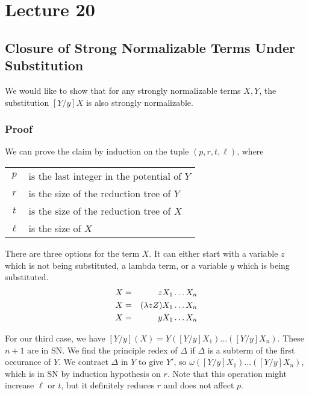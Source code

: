 \chapter{Lecture 20}

\section{Closure of Strong Normalizable Terms Under Substitution}
We would like to show that for any strongly normalizable terms $X,Y$, the substitution $[Y/y]X$ is also strongly normalizable.

\subsection{Proof}
We can prove the claim by induction on the tuple $(p,r,t,\ell)$, where
\begin{center}
  \begin{tabular}{c l}
    $p$ & is the last integer in the potential of $Y$\\
    $r$ & is the size of the reduction tree of $Y$\\
    $t$ & is the size of the reduction tree of $X$\\
    $\ell$ & is the size of $X$\\
  \end{tabular}
\end{center}

There are three options for the term $X$. It can either start with a variable $z$ which is not being substituted, a lambda term, or a variable $y$ which is being substituted.
\begin{eqnarray*}
  X &=& zX_1\ldots X_n\\
  X &=& (\lambda zZ)X_1\ldots X_n\\
  X &=& yX_1\ldots X_n\\
\end{eqnarray*}

For our third case, we have $[Y/y](X) = Y([Y/y]X_1)\ldots([Y/y]X_n)$. These $n + 1$ are in SN. We find the principle redex of $\Delta$ if $\Delta$ is a subterm of the first occurance of $Y$. We contract $\Delta$ in $Y$ to give $Y'$, so $\omega([Y/y]X_1)\ldots([Y/y]X_n)$, which is in SN by induction hypothesis on $r$. Note that this operation might increase $\ell$ or $t$, but it definitely reduces $r$ and does not affect $p$.\\

